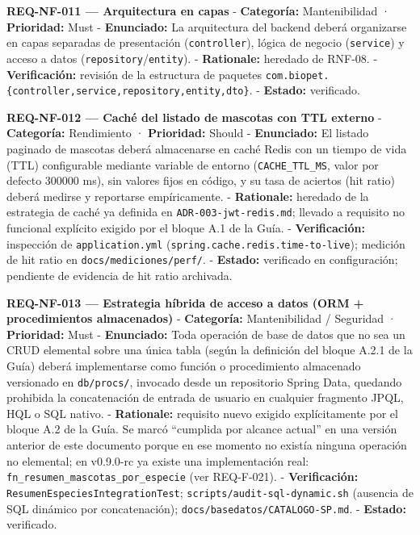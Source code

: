 \documentclass[
]{article}
\begin{document}
\textbf{REQ-NF-011 --- Arquitectura en capas} - \textbf{Categoría:}
Mantenibilidad · \textbf{Prioridad:} Must - \textbf{Enunciado:} La
arquitectura del backend deberá organizarse en capas separadas de
presentación (\texttt{controller}), lógica de negocio (\texttt{service})
y acceso a datos (\texttt{repository}/\texttt{entity}). -
\textbf{Rationale:} heredado de RNF-08. - \textbf{Verificación:}
revisión de la estructura de paquetes
\texttt{com.biopet.\{controller,service,repository,entity,dto\}}. -
\textbf{Estado:} verificado.

\textbf{REQ-NF-012 --- Caché del listado de mascotas con TTL externo} -
\textbf{Categoría:} Rendimiento · \textbf{Prioridad:} Should -
\textbf{Enunciado:} El listado paginado de mascotas deberá almacenarse
en caché Redis con un tiempo de vida (TTL) configurable mediante
variable de entorno (\texttt{CACHE\_TTL\_MS}, valor por defecto 300000
ms), sin valores fijos en código, y su tasa de aciertos (hit ratio)
deberá medirse y reportarse empíricamente. - \textbf{Rationale:}
heredado de la estrategia de caché ya definida en
\texttt{ADR-003-jwt-redis.md}; llevado a requisito no funcional
explícito exigido por el bloque A.1 de la Guía. - \textbf{Verificación:}
inspección de \texttt{application.yml}
(\texttt{spring.cache.redis.time-to-live}); medición de hit ratio en
\texttt{docs/mediciones/perf/}. - \textbf{Estado:} verificado en
configuración; pendiente de evidencia de hit ratio archivada.

\textbf{REQ-NF-013 --- Estrategia híbrida de acceso a datos (ORM +
procedimientos almacenados)} - \textbf{Categoría:} Mantenibilidad /
Seguridad · \textbf{Prioridad:} Must - \textbf{Enunciado:} Toda
operación de base de datos que no sea un CRUD elemental sobre una única
tabla (según la definición del bloque A.2.1 de la Guía) deberá
implementarse como función o procedimiento almacenado versionado en
\texttt{db/procs/}, invocado desde un repositorio Spring Data, quedando
prohibida la concatenación de entrada de usuario en cualquier fragmento
JPQL, HQL o SQL nativo. - \textbf{Rationale:} requisito nuevo exigido
explícitamente por el bloque A.2 de la Guía. Se marcó ``cumplida por
alcance actual'' en una versión anterior de este documento porque en ese
momento no existía ninguna operación no elemental; en v0.9.0-rc ya
existe una implementación real:
\texttt{fn\_resumen\_mascotas\_por\_especie} (ver REQ-F-021). -
\textbf{Verificación:} \texttt{ResumenEspeciesIntegrationTest};
\texttt{scripts/audit-sql-dynamic.sh} (ausencia de SQL dinámico por
concatenación); \texttt{docs/basedatos/CATALOGO-SP.md}. -
\textbf{Estado:} verificado.
\end{document}
